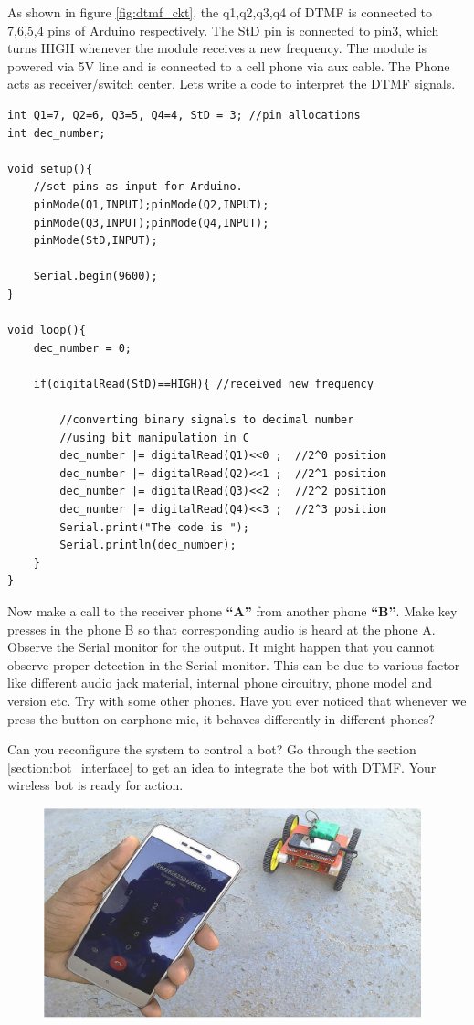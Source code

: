 \par As shown in figure \ref{fig:dtmf_ckt}, the q1,q2,q3,q4 of \ac{DTMF} is connected to 7,6,5,4 pins of Arduino respectively. The StD pin is connected to pin3, which turns HIGH whenever the module receives a new frequency. The module is powered via 5V line and is connected to a cell phone via aux cable. The Phone acts as receiver/switch center. Lets write a code to interpret the \ac{DTMF} signals.
\vspace{0.2cm}
\begin{lstlisting}[style=CStyle]
int Q1=7, Q2=6, Q3=5, Q4=4, StD = 3; //pin allocations
int dec_number;

void setup(){
    //set pins as input for Arduino.
    pinMode(Q1,INPUT);pinMode(Q2,INPUT);
    pinMode(Q3,INPUT);pinMode(Q4,INPUT);
    pinMode(StD,INPUT);
    
    Serial.begin(9600);
}

void loop(){
    dec_number = 0;
    
    if(digitalRead(StD)==HIGH){ //received new frequency
    
        //converting binary signals to decimal number
        //using bit manipulation in C
        dec_number |= digitalRead(Q1)<<0 ;  //2^0 position
        dec_number |= digitalRead(Q2)<<1 ;	//2^1 position
        dec_number |= digitalRead(Q3)<<2 ;	//2^2 position
        dec_number |= digitalRead(Q4)<<3 ;	//2^3 position
        Serial.print("The code is "); 
        Serial.println(dec_number);
    }
}
\end{lstlisting}

\par Now make a call to the receiver phone \textbf{“A”} from another phone \textbf{“B”}. Make key presses in the phone B so that corresponding audio is heard at the phone A. Observe the Serial monitor for the output. It might happen that you cannot observe proper detection in the Serial monitor. This can be due to various factor like different audio jack material, internal phone circuitry, phone model and version etc. Try with some other phones. Have you ever noticed that whenever we press the button on earphone mic, it behaves differently in different phones?

\par Can you reconfigure the system to control a bot? Go through the section \ref{section:bot_interface} to get an idea to integrate the bot with \ac{DTMF}. Your wireless bot is ready for action.

\begin{figure}
	\centering
	\includegraphics[width=4.3in]{Images/DTMF/wireless_bot.png}
\end{figure}

